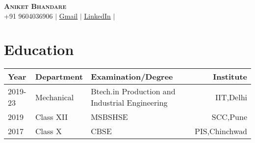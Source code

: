 \documentclass[letterpaper,11pt]{article}
\begin{document}
\begin{center}
    \textbf{\Large \scshape Aniket Bhandare } \\ \vspace{5pt}
    \small+91 9604036906 $|$ \href{mailto:avbhandare.iitd@gmail.com}{\underline{Gmail}} $|$ 
    \href{https://linkedin.com/in/aditya-kumar-inductor}{\underline{LinkedIn}} $|$
    
\end{center}


\section{Education}\vspace{-3mm}
    \begin{table}[h!]
      \begin{center}
        \begin{tabular}{p{}p{}p{}r{}} %
          \toprule
          \textbf{Year} & \textbf{Department} & \textbf{Examination/Degree}& \textbf{Institute }\\ \midrule
         
          2019-23 & Mechanical & Btech.in Production and Industrial Engineering & IIT,Delhi\\
          2019  & Class XII  & MSBSHSE & SCC,Pune\\
          2017 & Class X    & CBSE   & PIS,Chinchwad \\ \bottomrule
        \end{tabular}
      \end{center}
    \end{table}\vspace{-8mm}

\end{document}
